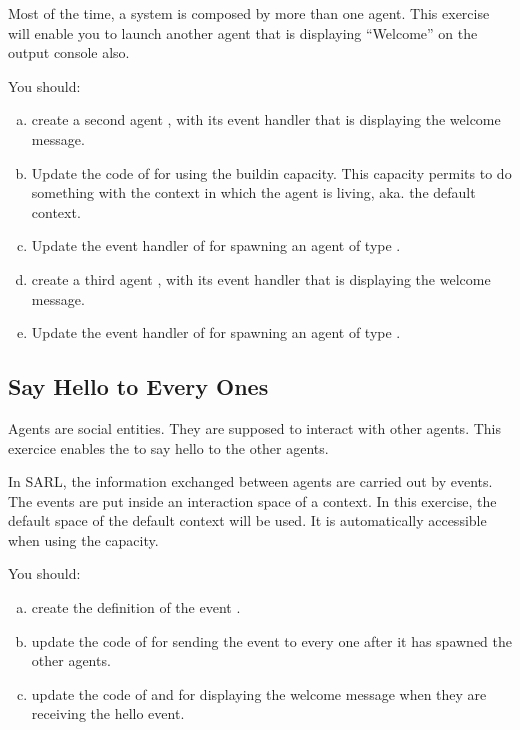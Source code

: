 \documentclass[article,english,nodocumentinfo]{multiagentfrreport}
\begin{document}
Most of the time, a system is composed by more than one agent. This exercise will enable you to launch another agent that is displaying ``Welcome'' on the output console also.

You should:
\begin{enumerate}[a)]
\item create a second agent , with its  event handler that is displaying the welcome message.
\item Update the code of  for using the  buildin capacity. This capacity permits to do something with the context in which the agent is living, aka. the default context.
\item Update the  event handler of  for spawning an agent of type .
\item create a third agent , with its  event handler that is displaying the welcome message.
\item Update the  event handler of  for spawning an agent of type .
\end{enumerate}

\subsection{Say Hello to Every Ones}

Agents are social entities. They are supposed to interact with other agents.
This exercice enables the  to say hello to the other agents.

In SARL, the information exchanged between agents are carried out by events.
The events are put inside an interaction space of a context.
In this exercise, the default space of the default context will be used.
It is automatically accessible when using the  capacity.

You should:
\begin{enumerate}[a)]
\item create the definition of the event .
\item update the code of  for sending the event to every one after it has spawned the other agents.
\item update the code of  and  for displaying the welcome message when they are receiving the hello event.
\end{enumerate}
\end{document}
